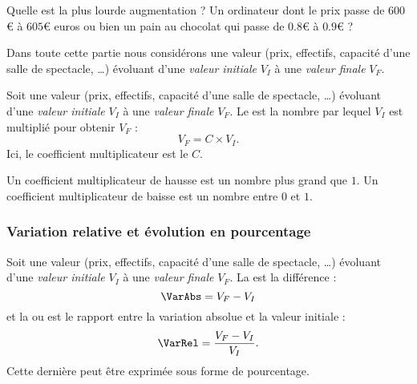 Quelle est la plus lourde augmentation ? Un ordinateur dont le prix passe de \( 600\)€ à \( 605\)€ euros ou bien un pain au chocolat qui passe de \( 0.8\)€ à \( 0.9\)€ ?

Dans toute cette partie nous considérons une valeur (prix, effectifs, capacité d'une salle de spectacle, \ldots) évoluant d'une \emph{valeur initiale} \( V_I\) à une \emph{valeur finale} \( V_F\).

\begin{definition}
    Soit une valeur (prix, effectifs, capacité d'une salle de spectacle, \ldots) évoluant d'une \emph{valeur initiale} \( V_I\) à une \emph{valeur finale} \( V_F\). Le  est la nombre par lequel \( V_I\) est multiplié pour obtenir \( V_F\) :
    \begin{equation}
        V_F=C\times V_I.
    \end{equation}
    Ici, le coefficient multiplicateur est le \( C\).
\end{definition}

Un coefficient multiplicateur de hausse est un nombre plus grand que \( 1\). Un coefficient multiplicateur de baisse est un nombre entre \( 0\) et \( 1\).

\subsubsection{Variation relative et évolution en pourcentage}

\begin{definition}
    Soit une valeur (prix, effectifs, capacité d'une salle de spectacle, \ldots) évoluant d'une \emph{valeur initiale} \( V_I\) à une \emph{valeur finale} \( V_F\). La  est la différence :
    \begin{equation}
        \VarAbs=V_F-V_I
    \end{equation}
    et la  ou  est le rapport entre la variation absolue et la valeur initiale :
    \begin{equation}
        \VarRel=\frac{ V_F-V_I }{ V_I }.
    \end{equation}
    Cette dernière peut être exprimée sous forme de pourcentage.
\end{definition}

